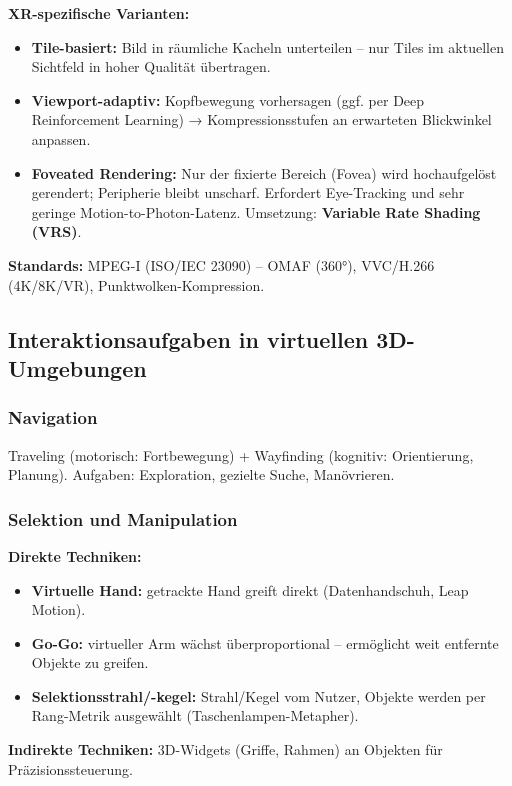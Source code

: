 \documentclass[12pt, a4paper]{article}
\begin{document}
\textbf{XR-spezifische Varianten:}
\begin{itemize}
  \item \textbf{Tile-basiert:} Bild in räumliche Kacheln unterteilen -- nur Tiles im aktuellen Sichtfeld in hoher Qualität übertragen.
  \item \textbf{Viewport-adaptiv:} Kopfbewegung vorhersagen (ggf. per Deep Reinforcement Learning) → Kompressionsstufen an erwarteten Blickwinkel anpassen.
  \item \textbf{Foveated Rendering:} Nur der fixierte Bereich (Fovea) wird hochaufgelöst gerendert; Peripherie bleibt unscharf. Erfordert Eye-Tracking und sehr geringe Motion-to-Photon-Latenz. Umsetzung: \textbf{Variable Rate Shading (VRS)}.
\end{itemize}

\textbf{Standards:} MPEG-I (ISO/IEC 23090) -- OMAF (360°), VVC/H.266 (4K/8K/VR), Punktwolken-Kompression.

\subsection{Interaktionsaufgaben in virtuellen 3D-Umgebungen}

\subsubsection*{Navigation}
Traveling (motorisch: Fortbewegung) + Wayfinding (kognitiv: Orientierung, Planung). Aufgaben: Exploration, gezielte Suche, Manövrieren.

\subsubsection*{Selektion und Manipulation}

\textbf{Direkte Techniken:}
\begin{itemize}
  \item \textbf{Virtuelle Hand:} getrackte Hand greift direkt (Datenhandschuh, Leap Motion).
  \item \textbf{Go-Go:} virtueller Arm wächst überproportional -- ermöglicht weit entfernte Objekte zu greifen.
  \item \textbf{Selektionsstrahl/-kegel:} Strahl/Kegel vom Nutzer, Objekte werden per Rang-Metrik ausgewählt (Taschenlampen-Metapher).
\end{itemize}

\textbf{Indirekte Techniken:} 3D-Widgets (Griffe, Rahmen) an Objekten für Präzisionssteuerung.
\end{document}

